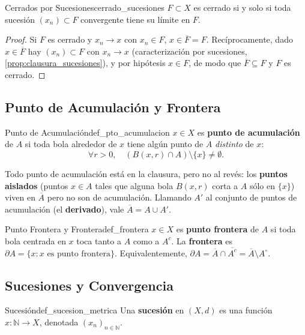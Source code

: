 \documentclass[11pt, a4paper]{article}
\begin{document}
\begin{corolario}{Cerrados por Sucesiones}{cerrado_sucesiones}
$F \subset X$ es cerrado si y solo si toda sucesión $(x_n) \subset F$ convergente tiene su
límite en $F$.

\begin{proof}
Si $F$ es cerrado y $x_n \to x$ con $x_n \in F$, $x \in \overline{F} = F$. Recíprocamente, dado
$x \in \overline{F}$ hay $(x_n) \subset F$ con $x_n \to x$ (caracterización por sucesiones,
\ref{prop:clausura_sucesiones}), y por
hipótesis $x \in F$, de modo que $\overline{F} \subseteq F$ y $F$ es cerrado.
\end{proof}
\end{corolario}

\subsection{Punto de Acumulación y Frontera}

\begin{definicion}{Punto de Acumulación}{def_pto_acumulacion}
$x \in X$ es \textbf{punto de acumulación} de $A$ si toda bola alrededor de $x$ tiene algún punto
de $A$ \emph{distinto} de $x$:
$$ \forall r > 0, \quad (B(x, r) \cap A) \setminus \{x\} \ne \emptyset. $$
\end{definicion}

\obs Todo punto de acumulación está en la clausura, pero no al revés: los
\textbf{puntos aislados} (puntos $x \in A$ tales que alguna bola $B(x, r)$ corta a $A$ sólo en
$\{x\}$) viven en $\overline{A}$ pero no son de acumulación. Llamando $A'$ al conjunto de puntos
de acumulación (el \textbf{derivado}), vale $\overline{A} = A \cup A'$.

\begin{definicion}{Punto Frontera y Frontera}{def_frontera}
$x \in X$ es \textbf{punto frontera} de $A$ si toda bola centrada en $x$ toca tanto a $A$ como a
$A^c$. La \textbf{frontera} es $\partial A = \{x : x \text{ es punto frontera}\}$. Equivalentemente,
$\partial A = \overline{A} \cap \overline{A^c} = \overline{A} \setminus A^\circ$.
\end{definicion}

\subsection{Sucesiones y Convergencia}

\begin{definicion}{Sucesión}{def_sucesion_metrica}
Una \textbf{sucesión} en $(X, d)$ es una función $x: \mathbb{N} \to X$, denotada
$(x_n)_{n \in \mathbb{N}}$.
\end{definicion}
\end{document}

